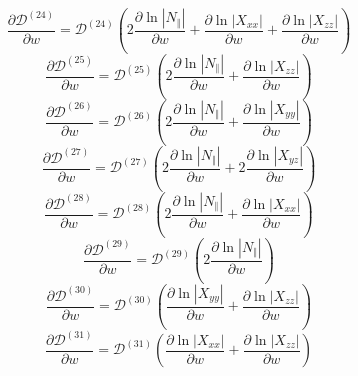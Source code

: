 \documentclass[a4paper,12pt]{article}%
\begin{document}
\begin{equation}
\frac{\partial\mathcal{D}^{\left(  24\right)  }}{\partial w}=\mathcal{D}%
^{\left(  24\right)  }\left(  2\frac{\partial\ln\left\vert N_{\Vert}^{{}%
}\right\vert }{\partial w}+\frac{\partial\ln\left\vert X_{xx}\right\vert
}{\partial w}+\frac{\partial\ln\left\vert X_{zz}\right\vert }{\partial
w}\right)
\end{equation}%
\begin{equation}
\frac{\partial\mathcal{D}^{\left(  25\right)  }}{\partial w}=\mathcal{D}%
^{\left(  25\right)  }\left(  2\frac{\partial\ln\left\vert N_{\Vert
}\right\vert }{\partial w}+\frac{\partial\ln\left\vert X_{zz}\right\vert
}{\partial w}\right)
\end{equation}%
\begin{equation}
\frac{\partial\mathcal{D}^{\left(  26\right)  }}{\partial w}=\mathcal{D}%
^{\left(  26\right)  }\left(  2\frac{\partial\ln\left\vert N_{\Vert
}\right\vert }{\partial w}+\frac{\partial\ln\left\vert X_{yy}\right\vert
}{\partial w}\right)
\end{equation}%
\begin{equation}
\frac{\partial\mathcal{D}^{\left(  27\right)  }}{\partial w}=\mathcal{D}%
^{\left(  27\right)  }\left(  2\frac{\partial\ln\left\vert N_{\Vert
}\right\vert }{\partial w}+2\frac{\partial\ln\left\vert X_{yz}\right\vert
}{\partial w}\right)
\end{equation}%
\begin{equation}
\frac{\partial\mathcal{D}^{\left(  28\right)  }}{\partial w}=\mathcal{D}%
^{\left(  28\right)  }\left(  2\frac{\partial\ln\left\vert N_{\Vert
}\right\vert }{\partial w}+\frac{\partial\ln\left\vert X_{xx}\right\vert
}{\partial w}\right)
\end{equation}%
\begin{equation}
\frac{\partial\mathcal{D}^{\left(  29\right)  }}{\partial w}=\mathcal{D}%
^{\left(  29\right)  }\left(  2\frac{\partial\ln\left\vert N_{\Vert
}\right\vert }{\partial w}\right)
\end{equation}%
\begin{equation}
\frac{\partial\mathcal{D}^{\left(  30\right)  }}{\partial w}=\mathcal{D}%
^{\left(  30\right)  }\left(  \frac{\partial\ln\left\vert X_{yy}\right\vert
}{\partial w}+\frac{\partial\ln\left\vert X_{zz}\right\vert }{\partial
w}\right)
\end{equation}%
\begin{equation}
\frac{\partial\mathcal{D}^{\left(  31\right)  }}{\partial w}=\mathcal{D}%
^{\left(  31\right)  }\left(  \frac{\partial\ln\left\vert X_{xx}\right\vert
}{\partial w}+\frac{\partial\ln\left\vert X_{zz}\right\vert }{\partial
w}\right)
\end{equation}%
\end{document}
